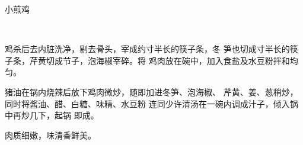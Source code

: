 \begin{recipe}{小煎鸡}

\ingredients

\\

\cooking

鸡杀后去内脏洗净，剔去骨头，宰成约寸半长的筷子条，冬
笋也切成寸半长的筷子条，芹黄切成节子，泡海椒宰碎。将
鸡肉放在碗中，加入食盐及水豆粉拌和均匀。

猪油在锅内烧辣后放下鸡肉微炒，随即加进冬笋、泡海椒、
芹黄、姜、葱稍炒，同时将酱油、醋、白糖、味精、水豆粉
连同少许清汤在一碗内调成汁子，倾入锅中再炒几下，起锅
即成。

\notes

肉质细嫩，味清香鲜美。

\end{recipe}

